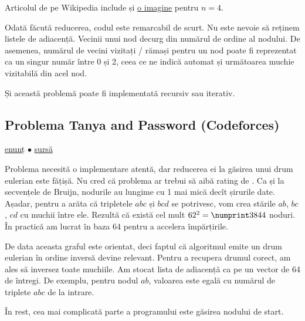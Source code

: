\documentclass[../main.tex]{subfiles}
\begin{document}
Articolul de pe Wikipedia include și \href{https://en.wikipedia.org/wiki/De_Bruijn_sequence#Construction}{o imagine} pentru $n = 4$.

Odată făcută reducerea, codul este remarcabil de scurt. Nu este nevoie să reținem listele de adiacență. Vecinii unui nod decurg din numărul de ordine al nodului. De asemenea, numărul de vecini vizitați / rămași pentru un nod poate fi reprezentat ca un singur număr între 0 și 2, ceea ce ne indică automat și următoarea muchie vizitabilă din acel nod.

Și această problemă poate fi implementată recursiv sau iterativ.

\subsection{Problema Tanya and Password (Codeforces)}
\label{problem:tanya-and-password}

\href{https://codeforces.com/contest/508/problem/D}{enunț}
$\bullet$
\hyperref[code:tanya-and-password]{sursă}

Problema necesită o implementare atentă, dar reducerea ei la găsirea unui drum eulerian este fățișă. Nu cred că problema ar trebui să aibă rating de . Ca și la secvențele de Bruijn, nodurile au lungime cu 1 mai mică decît șirurile date. Așadar, pentru a arăta că tripletele $abc$ și $bcd$ se potrivesc, vom crea stările $ab$, $bc$, $cd$ cu muchii între ele. Rezultă că există cel mult $62^2 = \np{3844}$ noduri. În practică am lucrat în baza 64 pentru a accelera împărțirile.

De data aceasta graful este orientat, deci faptul că algoritmul emite un drum eulerian în ordine inversă devine relevant. Pentru a recupera drumul corect, am ales să inversez toate muchiile. Am stocat lista de adiacență ca pe un vector de 64 de întregi. De exemplu, pentru nodul $ab$, valoarea  este egală cu numărul de triplete $abc$ de la intrare.

În rest, cea mai complicată parte a programului este găsirea nodului de start. 
\end{document}
